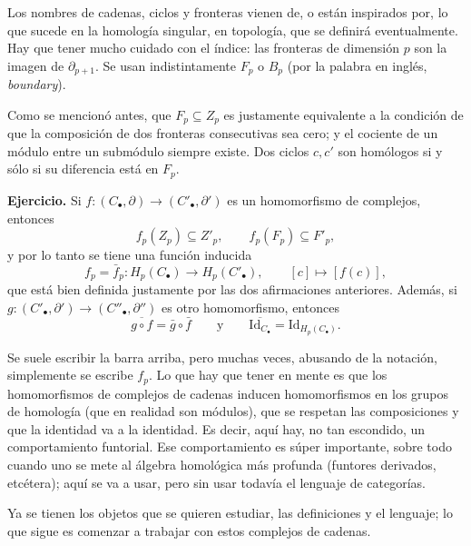 \documentclass[11pt]{article}
\begin{document}
Los nombres de cadenas, ciclos y fronteras vienen de, o están inspirados por, lo que sucede en la homología singular, en topología, que se definirá eventualmente. Hay que tener mucho cuidado con el índice: las fronteras de dimensión $p$ son la imagen de $\partial_{p+1}$. Se usan indistintamente $F_p$ o $B_p$ (por la palabra en inglés, \emph{boundary}).

Como se mencionó antes, que $F_p\subseteq Z_p$ es justamente equivalente a la condición de que la composición de dos fronteras consecutivas sea cero; y el cociente de un módulo entre un submódulo siempre existe. Dos ciclos $c,c'$ son homólogos si y sólo si su diferencia está en $F_p$.

\medskip\noindent\textbf{Ejercicio.} Si $f\colon(C_\bullet,\partial)\to(C'_\bullet,\partial')$ es un homomorfismo de complejos, entonces
\[
  f_p(Z_p)\subseteq Z'_p,\qquad f_p(F_p)\subseteq F'_p ,
\]
y por lo tanto se tiene una función inducida
\[
  f_p=\bar f_p\colon H_p(C_\bullet)\to H_p(C'_\bullet),\qquad[c]\longmapsto[f(c)],
\]
que está bien definida justamente por las dos afirmaciones anteriores. Además, si $g\colon(C'_\bullet,\partial')\to(C''_\bullet,\partial'')$ es otro homomorfismo, entonces
\[
  \overline{g\circ f}=\bar g\circ\bar f\qquad\text{y}\qquad\overline{\mathrm{Id}_{C_\bullet}}=\mathrm{Id}_{H_p(C_\bullet)} .
\]

Se suele escribir la barra arriba, pero muchas veces, abusando de la notación, simplemente se escribe $f_p$. Lo que hay que tener en mente es que los homomorfismos de complejos de cadenas inducen homomorfismos en los grupos de homología (que en realidad son módulos), que se respetan las composiciones y que la identidad va a la identidad. Es decir, aquí hay, no tan escondido, un comportamiento funtorial. Ese comportamiento es súper importante, sobre todo cuando uno se mete al álgebra homológica más profunda (funtores derivados, etcétera); aquí se va a usar, pero sin usar todavía el lenguaje de categorías.

Ya se tienen los objetos que se quieren estudiar, las definiciones y el lenguaje; lo que sigue es comenzar a trabajar con estos complejos de cadenas.
\end{document}

